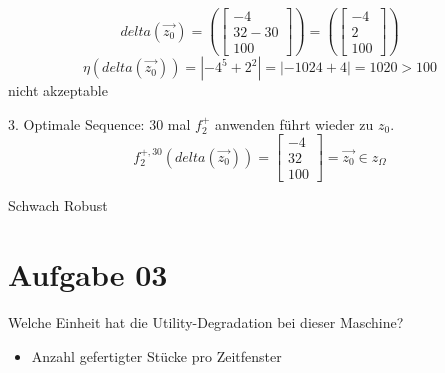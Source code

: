 \documentclass{ocbeameruni}
\begin{document}
\begin{frame}{2.2}
\begin{equation}
delta(\vec{z_0}) = ( \begin{bmatrix}-4\\32-30\\100\end{bmatrix} ) = ( \begin{bmatrix}-4\\2\\100\end{bmatrix} )
\end{equation}
\begin{equation}
\eta(delta(\vec{z_0})) = |-4^5 + 2^2| = |-1024 + 4| = 1020 > 100
\end{equation}
nicht akzeptable
\end{frame}

\begin{frame}{2.3}
3. Optimale Sequence: 30 mal $f_2^{+}$ anwenden führt wieder zu $z_0$.
\begin{equation}
f_2^{+,30}(delta(\vec{z_0})) = \begin{bmatrix}-4\\32\\100\end{bmatrix} = \vec{z_0} \in z_{\Omega}
\end{equation}
\end{frame}

\begin{frame}{2.4}
Schwach Robust
\end{frame}

\section{Aufgabe 03}

\begin{frame}{3.1}
Welche Einheit hat die Utility-Degradation bei dieser Maschine?
    \begin{itemize}
    \item Anzahl gefertigter Stücke pro Zeitfenster
    \end{itemize}
\end{frame}
\end{document}
